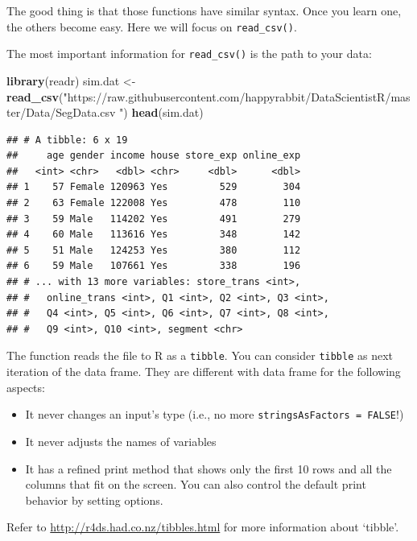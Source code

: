 \documentclass[12pt,]{krantz}
\newenvironment{Shaded}{\begin{snugshade}}{\end{snugshade}}
\newcommand{\KeywordTok}[1]{\textcolor[rgb]{0.13,0.29,0.53}{\textbf{#1}}}
\newcommand{\StringTok}[1]{\textcolor[rgb]{0.31,0.60,0.02}{#1}}
\newcommand{\NormalTok}[1]{#1}
\providecommand{\tightlist}{%
  \setlength{\itemsep}{0pt}\setlength{\parskip}{0pt}}
\theoremstyle{definition}
\theoremstyle{definition}
\theoremstyle{definition}
\theoremstyle{remark}
\begin{document}
The good thing is that those functions have similar syntax. Once you
learn one, the others become easy. Here we will focus on
\texttt{read\_csv()}.

The most important information for \texttt{read\_csv()} is the path to
your data:

\begin{Shaded}
\begin{Highlighting}[]
\KeywordTok{library}\NormalTok{(readr)}
\NormalTok{sim.dat <-}\StringTok{ }\KeywordTok{read_csv}\NormalTok{(}\StringTok{"https://raw.githubusercontent.com/happyrabbit/DataScientistR/master/Data/SegData.csv "}\NormalTok{)}
\KeywordTok{head}\NormalTok{(sim.dat)}
\end{Highlighting}
\end{Shaded}

\begin{verbatim}
## # A tibble: 6 x 19
##     age gender income house store_exp online_exp
##   <int> <chr>   <dbl> <chr>     <dbl>      <dbl>
## 1    57 Female 120963 Yes         529        304
## 2    63 Female 122008 Yes         478        110
## 3    59 Male   114202 Yes         491        279
## 4    60 Male   113616 Yes         348        142
## 5    51 Male   124253 Yes         380        112
## 6    59 Male   107661 Yes         338        196
## # ... with 13 more variables: store_trans <int>,
## #   online_trans <int>, Q1 <int>, Q2 <int>, Q3 <int>,
## #   Q4 <int>, Q5 <int>, Q6 <int>, Q7 <int>, Q8 <int>,
## #   Q9 <int>, Q10 <int>, segment <chr>
\end{verbatim}

The function reads the file to R as a \texttt{tibble}. You can consider
\texttt{tibble} as next iteration of the data frame. They are different
with data frame for the following aspects:

\begin{itemize}
\tightlist
\item
  It never changes an input's type (i.e., no more
  \texttt{stringsAsFactors\ =\ FALSE}!)
\item
  It never adjusts the names of variables
\item
  It has a refined print method that shows only the first 10 rows and
  all the columns that fit on the screen. You can also control the
  default print behavior by setting options.
\end{itemize}

Refer to \url{http://r4ds.had.co.nz/tibbles.html} for more information
about `tibble'.
\end{document}
